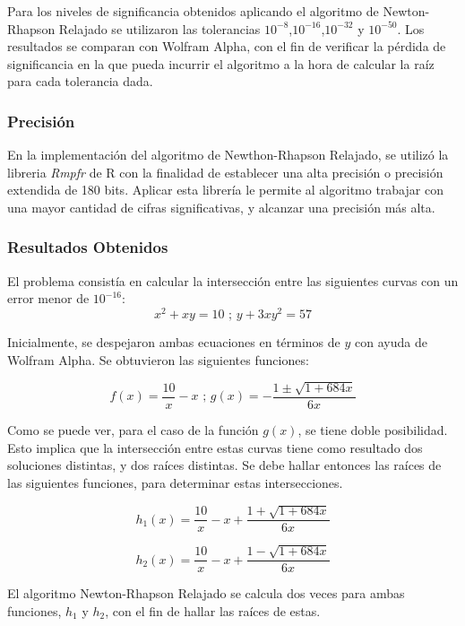 \documentclass[a4paper,12pt]{article}
\begin{document}
Para los niveles de significancia obtenidos aplicando el algoritmo de Newton-Rhapson Relajado se utilizaron las tolerancias $10^{-8}$,$10^{-16}$,$10^{-32}$ y $10^{-50}$. Los resultados se comparan con Wolfram Alpha, con el fin de verificar la pérdida de significancia en la que pueda incurrir el algoritmo a la hora de calcular la raíz para cada tolerancia dada. \par

\subsubsection{Precisión}

En la implementación del algoritmo de Newthon-Rhapson Relajado, se utilizó la libreria \textit{Rmpfr} de R con la finalidad de establecer una alta precisión o precisión extendida de 180 bits. Aplicar esta librería le permite al algoritmo trabajar con una mayor cantidad de cifras significativas, y alcanzar una precisión más alta. \par

\subsubsection{Resultados Obtenidos}

El problema consistía en calcular la intersección entre las siguientes curvas con un error menor de $10^{-16}$:
\[ x^2 + xy = 10 \textrm{ ; } y + 3xy^2 = 57 \]

Inicialmente, se despejaron ambas ecuaciones en términos de $y$ con ayuda de Wolfram Alpha. Se obtuvieron las siguientes funciones: \par

\[ f(x)=\frac{10}{x}-x \textrm{ ; } g(x)=-\frac{1 \pm \sqrt{1 + 684 x}}{6x} \]

Como se puede ver, para el caso de la función $g(x)$, se tiene doble posibilidad. Esto implica que la intersección entre estas curvas tiene como resultado dos soluciones distintas, y dos raíces distintas. Se debe hallar entonces las raíces de las siguientes funciones, para determinar estas intersecciones. \par 

\[ h_1(x)=\frac{10}{x}-x +\frac{1 + \sqrt{1 + 684 x}}{6x} \]

\[ h_2(x)=\frac{10}{x}-x +\frac{1 - \sqrt{1 + 684 x}}{6x} \]

El algoritmo Newton-Rhapson Relajado se calcula dos veces para ambas funciones, $h_1$ y $h_2$, con el fin de hallar las raíces de estas. \par
\end{document}
